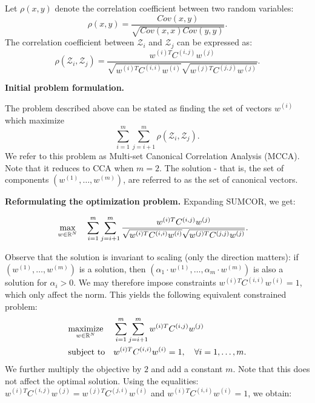 Let $\rho\left(x,y\right)$ denote the correlation
 coefficient between two random variables:
\begin{equation*}
\rho\left(x,y\right) =
 \frac{Cov\left(x,y\right)}{\sqrt{Cov\left(x,x\right) Cov\left(y,y\right)}}.
\end{equation*}
 The correlation coefficient between $\mathcal{Z}_i$ and
 $\mathcal{Z}_j$ can be expressed as:
\begin{equation*}
\rho\left(\mathcal{Z}_i, \mathcal{Z}_j\right) = \frac{w^{(i)T} C^{(i,j)}
   w^{(j)}}{\sqrt{w^{(i)T} C^{(i,i)} w^{(i)}}\sqrt{w^{(j)T}
     C^{(j,j)} w^{(j)}} }.
\end{equation*}

\noindent\textbf{Initial problem formulation.} 

The problem described above can be stated as
finding the set of vectors $w^{(i)}$
which maximize
\begin{equation}\label{eq:SUMCOR}
\tag{SUMCOR}
\sum_{i = 1}^m \sum_{j = i+1}^m
\rho\left(\mathcal{Z}_i, \mathcal{Z}_j\right).
\end{equation}
We refer to this problem as Multi-set Canonical
Correlation Analysis (MCCA). Note that it reduces to CCA when
$m=2$. The solution - that is, the set of components $\left(w^{(1)}, \ldots, w^{(m)}\right)$, 
are referred to as the set of canonical vectors.

\noindent\textbf{Reformulating the optimization problem.} 
Expanding SUMCOR, we get:

\begin{equation*}
\begin{aligned}
& \underset{w \in \mathbb{R}^N}{\text{max}} & & \sum_{i = 1}^m
  \sum_{j = i+1}^m \frac{w^{(i)T} C^{(i,j)}
    w^{(j)}}{\sqrt{w^{(i)T} C^{(i,i)} w^{(i)}} \sqrt{w^{(j)T}
      C^{(j,j)} w^{(j)}}}.
\end{aligned}
\end{equation*}

Observe that the solution is invariant to scaling (only the direction matters): 
if $\left(w^{(1)}, \ldots, w^{(m)}\right)$ is a solution, then 
$\left(\alpha_1 \cdot w^{(1)}, \ldots, \alpha_m \cdot w^{(m)}\right)$ is also a 
solution for $\alpha_i > 0$. We may therefore impose constraints $w^{(i)T}C^{(i,i)}w^{(i)} = 1$, 
which only affect the norm. This yields the following  equivalent constrained problem:
\begin{equation}\label{eq:qcqp0}
\begin{aligned}
& \underset{w \in \mathbb{R}^N}{\text{maximize}}
& & \sum_{i = 1}^m \sum_{j = i+1}^m w^{(i)T} C^{(i,j)} w^{(j)}\\
& \text{subject to}
& &w^{(i)T} C^{(i,i)} w^{(i)} = 1, \quad\forall i = 1,\ldots, m.
\end{aligned}
\end{equation}
We further multiply the objective by $2$ and add a constant $m$. Note that this does not
affect the optimal solution. Using the equalities: $w^{(i)T} C^{(i,j)} w^{(j)} = w^{(j)T} C^{(j,i)} w^{(i)}$ 
and $w^{(i)T} C^{(i,i)} w^{(i)} = 1$, we obtain:

